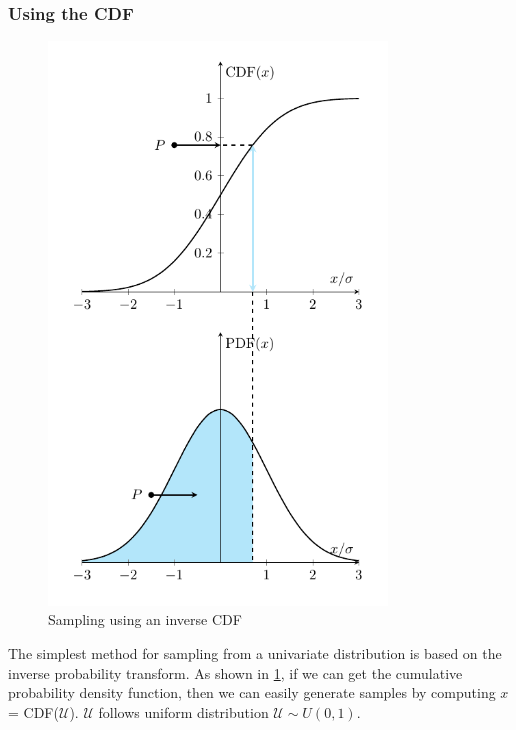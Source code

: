 \subsubsection{Using the CDF}

\begin{figure}[H]
    \centering
    \includegraphics[width = 90mm]{Figures/figure-CDF.pdf}
    \caption{Sampling using an inverse CDF}
    \label{fig:fig_CDF_sample}
\end{figure}

The simplest method for sampling from a univariate distribution is based on the inverse probability transform. As shown in \cref{fig:fig_CDF_sample}, if we can get the cumulative probability density function, then we can easily generate samples by computing $x$ = CDF($\mathcal{U}$). $\mathcal{U}$ follows uniform distribution $\mathcal{U} \sim U(0,1)$.




